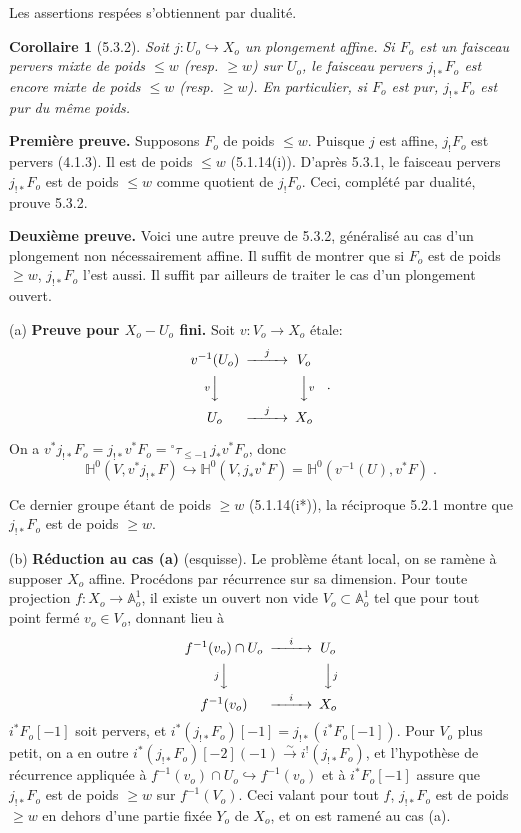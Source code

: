 \documentclass[12pt,a4paper]{article}
\theoremstyle{plain}
\newtheorem{corollary}[theorem]{Corollaire}
\theoremstyle{definition}
\theoremstyle{remark}
\newcommand{\HH}{\mathbb{H}}
\begin{document}
\setcounter{section}{5}
\setcounter{theorem}{1}

Les assertions resp\'ees s'obtiennent par dualit\'e.

\begin{corollary}[5.3.2]
Soit $j: U_o \hookrightarrow X_o$ un plongement affine. Si $F_o$ est un faisceau pervers mixte de poids $\leq w$ (resp. $\geq w$) sur $U_o$, le faisceau pervers $j_{!*}F_o$ est encore mixte de poids $\leq w$ (resp. $\geq w$). En particulier, si $F_o$ est pur, $j_{!*}F_o$ est pur du m\^eme poids.
\end{corollary}

\noindent\textbf{Premi\`ere preuve.} Supposons $F_o$ de poids $\leq w$. Puisque $j$ est affine, $j_!F_o$ est pervers (4.1.3). Il est de poids $\leq w$ (5.1.14(i)). D'apr\`es 5.3.1, le faisceau pervers $j_{!*}F_o$ est de poids $\leq w$ comme quotient de $j_!F_o$. Ceci, compl\'et\'e par dualit\'e, prouve 5.3.2.

\medskip
\noindent\textbf{Deuxi\`eme preuve.} Voici une autre preuve de 5.3.2, g\'en\'eralis\'e au cas d'un plongement non n\'ecessairement affine. Il suffit de montrer que si $F_o$ est de poids $\geq w$, $j_{!*}F_o$ l'est aussi. Il suffit par ailleurs de traiter le cas d'un plongement ouvert.

\medskip
(a) \textbf{Preuve pour $X_o - U_o$ fini.} Soit $v: V_o \to X_o$ \'etale:
\[
\begin{CD}
v^{-1}(U_o) @>{j}>> V_o \\
@V{v}VV @VV{v}V \\
U_o @>{j}>> X_o
\end{CD}\quad.
\]

On a $v^*j_{!*}F_o = j_{!*}v^*F_o = {}^{\circ}\tau_{\leq -1}\, j_*v^*F_o$, donc
\[
\HH^0(V, v^*j_{!*}F) \hookrightarrow \HH^0(V, j_*v^*F) = \HH^0(v^{-1}(U), v^*F)\;.
\]

Ce dernier groupe \'etant de poids $\geq w$ (5.1.14(i*)), la r\'eciproque 5.2.1 montre que $j_{!*}F_o$ est de poids $\geq w$.

\medskip
(b) \textbf{R\'eduction au cas (a)} (esquisse). Le probl\`eme \'etant local, on se ram\`ene \`a supposer $X_o$ affine. Proc\'edons par r\'ecurrence sur sa dimension. Pour toute projection $f: X_o \to \mathbb{A}^1_o$, il existe un ouvert non vide $V_o \subset \mathbb{A}^1_o$ tel que pour tout point ferm\'e $v_o \in V_o$, donnant lieu \`a
\[
\begin{CD}
f^{-1}(v_o) \cap U_o @>{i}>> U_o \\
@V{j}VV @VV{j}V \\
f^{-1}(v_o) @>{i}>> X_o
\end{CD}
\]
$i^*F_o[-1]$ soit pervers, et $i^*(j_{!*}F_o)[-1] = j_{!*}(i^*F_o[-1])$. Pour $V_o$ plus petit, on a en outre $i^*(j_{!*}F_o)[-2](-1) \xrightarrow{\sim} i^!(j_{!*}F_o)$, et l'hypoth\`ese de r\'ecurrence appliqu\'ee \`a $f^{-1}(v_o) \cap U_o \hookrightarrow f^{-1}(v_o)$ et \`a $i^*F_o[-1]$ assure que $j_{!*}F_o$ est de poids $\geq w$ sur $f^{-1}(V_o)$. Ceci valant pour tout $f$, $j_{!*}F_o$ est de poids $\geq w$ en dehors d'une partie fix\'ee $Y_o$ de $X_o$, et on est ramen\'e au cas (a).
\end{document}
